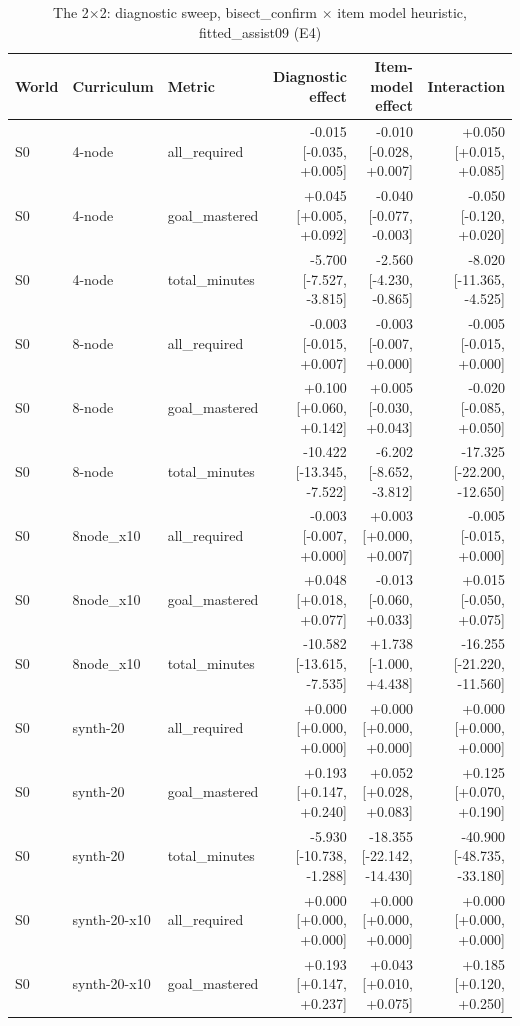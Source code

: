 \begin{table}[htbp]
\centering\small
\caption{The 2$\times$2: diagnostic {sweep, bisect\_confirm} $\times$ item model {heuristic, fitted\_assist09} (E4)}
\label{tab:t10}
\begin{tabular}{lllrrr}
\toprule
World & Curriculum & Metric & Diagnostic effect & Item-model effect & Interaction \\
\midrule
S0 & 4-node & all\_required & -0.015 [-0.035, +0.005] & -0.010 [-0.028, +0.007] & +0.050 [+0.015, +0.085] \\
S0 & 4-node & goal\_mastered & +0.045 [+0.005, +0.092] & -0.040 [-0.077, -0.003] & -0.050 [-0.120, +0.020] \\
S0 & 4-node & total\_minutes & -5.700 [-7.527, -3.815] & -2.560 [-4.230, -0.865] & -8.020 [-11.365, -4.525] \\
S0 & 8-node & all\_required & -0.003 [-0.015, +0.007] & -0.003 [-0.007, +0.000] & -0.005 [-0.015, +0.000] \\
S0 & 8-node & goal\_mastered & +0.100 [+0.060, +0.142] & +0.005 [-0.030, +0.043] & -0.020 [-0.085, +0.050] \\
S0 & 8-node & total\_minutes & -10.422 [-13.345, -7.522] & -6.202 [-8.652, -3.812] & -17.325 [-22.200, -12.650] \\
S0 & 8node\_x10 & all\_required & -0.003 [-0.007, +0.000] & +0.003 [+0.000, +0.007] & -0.005 [-0.015, +0.000] \\
S0 & 8node\_x10 & goal\_mastered & +0.048 [+0.018, +0.077] & -0.013 [-0.060, +0.033] & +0.015 [-0.050, +0.075] \\
S0 & 8node\_x10 & total\_minutes & -10.582 [-13.615, -7.535] & +1.738 [-1.000, +4.438] & -16.255 [-21.220, -11.560] \\
S0 & synth-20 & all\_required & +0.000 [+0.000, +0.000] & +0.000 [+0.000, +0.000] & +0.000 [+0.000, +0.000] \\
S0 & synth-20 & goal\_mastered & +0.193 [+0.147, +0.240] & +0.052 [+0.028, +0.083] & +0.125 [+0.070, +0.190] \\
S0 & synth-20 & total\_minutes & -5.930 [-10.738, -1.288] & -18.355 [-22.142, -14.430] & -40.900 [-48.735, -33.180] \\
S0 & synth-20-x10 & all\_required & +0.000 [+0.000, +0.000] & +0.000 [+0.000, +0.000] & +0.000 [+0.000, +0.000] \\
S0 & synth-20-x10 & goal\_mastered & +0.193 [+0.147, +0.237] & +0.043 [+0.010, +0.075] & +0.185 [+0.120, +0.250] \\

\end{tabular}
\end{table}

